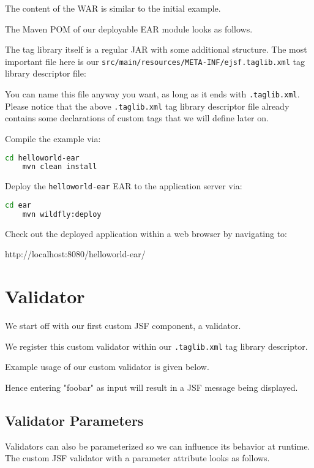 The content of the WAR is similar to the initial example.

The Maven POM of our deployable EAR module looks as follows.


The tag library itself is a regular JAR with some additional structure.
The most important file here is our \texttt{src/main/resources/META-INF/ejsf.taglib.xml} tag library descriptor file:

You can name this file anyway you want, as long as it ends with \texttt{.taglib.xml}.
Please notice that the above \texttt{.taglib.xml} tag library descriptor file already contains some declarations of custom tags that we will define later on.

Compile the example via:
\begin{lstlisting}[language=bash]
	cd helloworld-ear
	mvn clean install
\end{lstlisting}

Deploy the \texttt{helloworld-ear} EAR to the application server via:
\begin{lstlisting}[language=bash]
	cd ear
	mvn wildfly:deploy
\end{lstlisting}

Check out the deployed application within a web browser by navigating to:

http://localhost:8080/helloworld-ear/

\section{Validator}
\label{sec:validator}
We start off with our first custom JSF component, a validator.


We register this custom validator within our \texttt{.taglib.xml} tag library descriptor.


Example usage of our custom validator is given below.

Hence entering "foobar" as input will result in a JSF message being displayed.


\subsection{Validator Parameters}
Validators can also be parameterized so we can influence its behavior at runtime. 
The custom JSF  validator with a parameter attribute looks as follows.


